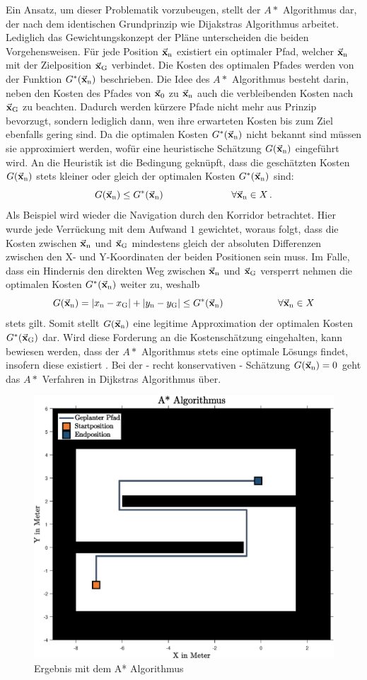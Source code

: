 Ein Ansatz, um dieser Problematik vorzubeugen, stellt der $A*$ Algorithmus dar, der nach dem identischen Grundprinzip wie Dijakstras Algorithmus arbeitet. Lediglich das Gewichtungskonzept der Pläne unterscheiden die beiden Vorgehensweisen. Für jede Position $\vec{\mathbf{x}}_{\text{n}}$ existiert ein optimaler Pfad, welcher $\vec{\mathbf{x}}_{\text{n}}$ mit der Zielposition $\vec{\mathbf{x}}_{\text{G}}$ verbindet. Die Kosten des optimalen Pfades werden von der Funktion $G^*(\vec{\mathbf{x}}_{\text{n}})$ beschrieben. Die Idee des $A*$ Algorithmus besteht darin, neben den Kosten des Pfades von $\vec{\mathbf{x}}_{\text{0}}$ zu $\vec{\mathbf{x}}_{\text{n}}$ auch die verbleibenden Kosten nach $\vec{\mathbf{x}}_{\text{G}}$ zu beachten. Dadurch werden kürzere Pfade nicht mehr aus Prinzip bevorzugt, sondern lediglich dann, wen ihre erwarteten Kosten bis zum Ziel ebenfalls gering sind. Da die optimalen Kosten $G^*(\vec{\mathbf{x}}_{\text{n}})$ nicht bekannt sind müssen sie approximiert werden, wofür eine heuristische Schätzung $G(\vec{\mathbf{x}}_{\text{n}})$ eingeführt wird. An die Heuristik ist die Bedingung geknüpft, dass die geschätzten Kosten $G(\vec{\mathbf{x}}_{\text{n}})$ stets kleiner oder gleich der optimalen Kosten $G^*(\vec{\mathbf{x}}_{\text{n}})$ sind:
\begin{equation}
G(\vec{\mathbf{x}}_{\text{n}}) \leq G^*(\vec{\mathbf{x}}_{\text{n}}) \hspace{2.5cm} \forall \vec{\mathbf{x}}_{\text{n}} \in X\,.
\end{equation}
Als Beispiel wird wieder die Navigation durch den Korridor betrachtet. Hier wurde jede Verrückung mit dem Aufwand $1$ gewichtet, woraus folgt, dass die Kosten zwischen $\vec{\mathbf{x}}_{\text{n}}$ und $\vec{\mathbf{x}}_{\text{G}}$ mindestens gleich der absoluten Differenzen zwischen den X- und Y-Koordinaten der beiden Positionen sein muss. Im Falle, dass ein Hindernis den direkten Weg zwischen $\vec{\mathbf{x}}_{\text{n}}$ und $\vec{\mathbf{x}}_{\text{G}}$ versperrt nehmen die optimalen Kosten $G^*(\vec{\mathbf{x}}_{\text{n}})$ weiter zu, weshalb
\begin{equation}
G(\vec{\mathbf{x}}_{\text{n}}) = \vert x_{\text{n}} - x_{\text{G}}\vert + \vert y_{\text{n}} - y_{\text{G}}\vert \leq G^*(\vec{\mathbf{x}}_{\text{n}}) \hspace{2cm} \forall \vec{\mathbf{x}}_{\text{n}} \in X
\end{equation}
stets gilt. Somit stellt $G(\vec{\mathbf{x}}_{\text{n}})$ eine legitime Approximation der optimalen Kosten $G^*(\vec{\mathbf{x}}_{\text{G}})$ dar. Wird diese Forderung an die Kostenschätzung eingehalten, kann bewiesen werden, dass der $A*$ Algorithmus stets eine optimale Lösungs findet, insofern diese existiert \cite[S. 32]{PlanAlgo}\cite{SecRef1,SecRef2}. Bei der - recht konservativen - Schätzung $G(\vec{\mathbf{x}}_{\text{n}})=0$ geht das $A*$ Verfahren in Dijkstras Algorithmus über.
\begin{figure}[ht!]
\centering
\includegraphics[width=0.5\linewidth]{img/KorridorBeispiel_img7.eps}
\caption{Ergebnis mit dem A* Algorithmus}
\end{figure}

